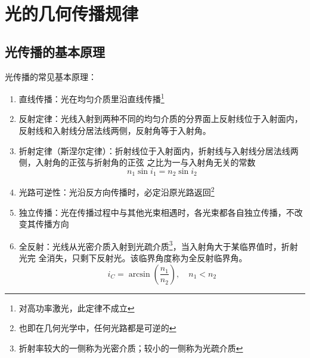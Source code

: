 \documentclass[UTF8]{report}
\theoremstyle{MyLineTheoremStyle} %
\theoremstyle{MyBlockTheoremStyle} %
\theoremstyle{MySubsubsectionStyle} %
\begin{document}
\section{光的几何传播规律}

\subsection{光传播的基本原理}

光传播的常见基本原理：
\begin{enumerate}
    \item 直线传播：光在均匀介质里沿直线传播\footnote{对高功率激光，此定律不成立}
    \item 反射定律：光线入射到两种不同的均匀介质的分界面上反射线位于入射面内，反射线和入射线分居法线两侧，反射角等于入射角。
    \item 折射定律（斯涅尔定律）：折射线位于入射面内，折射线与入射线分居法线两侧，入射角的正弦与折射角的正弦
    之比为一与入射角无关的常数
    \begin{equation}
    n_1\sin i_1 = n_2 \sin i_2
    \end{equation}    
    \item 光路可逆性：光沿反方向传播时，必定沿原光路返回\footnote{也即在几何光学中，任何光路都是可逆的}
    \item 独立传播：光在传播过程中与其他光束相遇时，各光束都各自独立传播，不改变其传播方向
    \item 全反射：光线从光密介质入射到光疏介质\footnote{折射率较大的一侧称为光密介质；较小的一侧称为光疏介质}，当入射角大于某临界值时，折射光完
    全消失，只剩下反射光。该临界角度称为全反射临界角。
    \begin{equation}
    i_C = \arcsin (\frac{n_1}{n_2}),\quad n_1<n_2
    \end{equation}
\end{enumerate}
\end{document}
